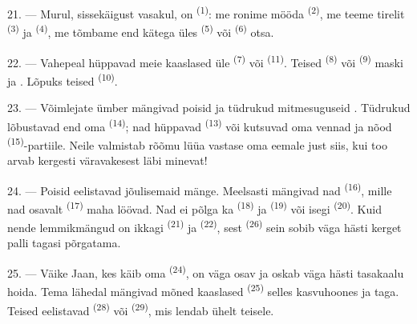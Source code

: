 21. --- Murul, sissekäigust vasakul, on \textsuperscript{(1)}:
me ronime mööda \textsuperscript{(2)}, me teeme tirelit
\textsuperscript{(3)} ja \textsuperscript{(4)}, me
tõmbame end kätega üles \textsuperscript{(5)} või
\textsuperscript{(6)} otsa.

22. --- Vahepeal hüppavad meie kaaslased üle \textsuperscript{(7)}
või \textsuperscript{(11)}. Teised
\textsuperscript{(8)} või \textsuperscript{(9)} maski
ja . Lõpuks  teised
\textsuperscript{(10)}.

\VUsaut{4.6mm}
\VUsaut{3.0mm}

23. --- Võimlejate ümber mängivad poisid ja tüdrukud mitmesuguseid
. Tüdrukud lõbustavad end oma
\textsuperscript{(14)}; nad hüppavad
\textsuperscript{(13)} või kutsuvad oma vennad ja nõod
\textsuperscript{(15)}-partiile. Neile valmistab rõõmu lüüa vastase
 oma  eemale just siis, kui too arvab kergesti
väravakesest läbi minevat!

24. --- Poisid eelistavad jõulisemaid mänge. Meelsasti mängivad nad
\textsuperscript{(16)}, mille nad osavalt \textsuperscript{(17)}
maha löövad. Nad ei põlga ka \textsuperscript{(18)} ja
\textsuperscript{(19)} või isegi
\textsuperscript{(20)}. Kuid nende lemmikmängud on ikkagi
\textsuperscript{(21)} ja \textsuperscript{(22)},
sest \textsuperscript{(26)} sein sobib väga hästi kerget palli
tagasi põrgatama.

25. --- Väike Jaan, kes käib oma \textsuperscript{(24)}, on väga osav
ja oskab väga hästi tasakaalu hoida. Tema lähedal mängivad mõned kaaslased
\textsuperscript{(25)} selles kasvuhoones ja  taga. Teised
eelistavad \textsuperscript{(28)} või
\textsuperscript{(29)}, mis lendab ühelt  teisele.

